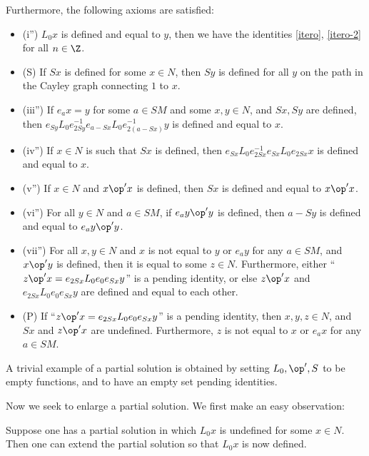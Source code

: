 Furthermore, the following axioms are satisfied:
\begin{itemize}
  \item (i'')  $L_0 x$ is defined and equal to $y$, then we have the identities \eqref{itero}, \eqref{itero-2} for all $n\in \Z$.
  \item (S) If $Sx$ is defined for some $x \in N$, then $Sy$ is defined for all $y$ on the path in the Cayley graph connecting $1$ to $x$.
  \item (iii'') If $e_a x = y$ for some $a \in SM$ and some $x,y \in N$, and $Sx, Sy$ are defined, then $e_{Sy} L_0 e_{2Sy}^{-1} e_{a-Sx} L_0 e_{2(a-Sx)}^{-1} y$ is defined and equal to $x$.
  \item (iv'') If $x \in N$ is such that $Sx$ is defined, then $e_{Sx} L_0 e_{2Sx}^{-1} e_{Sx} L_0 e_{2Sx} x$ is defined and equal to $x$.
  \item (v'')  If $x \in N$ and $x \op' x$ is defined, then $Sx$ is defined and equal to $x \op' x$.
  \item (vi'')  For all $y \in N$ and $a \in SM$, if $e_a y \op' y$ is defined, then $a - Sy$ is defined and equal to $e_a y \op' y$.
  \item (vii'')  For all $x,y \in N$ and $x$ is not equal to $y$ or $e_a y$ for any $a \in SM$, and $x \op' y$ is defined, then it is equal to some $z \in N$.  Furthermore, either ``$z \op' x = e_{2Sx} L_0 e_0 e_{Sx} y$'' is a pending identity, or else $z \op' x$ and $e_{2Sx} L_0 e_0 e_{Sx} y$ are defined and equal to each other.
  \item (P) If ``$z \op' x = e_{2Sx} L_0 e_0 e_{Sx} y$'' is a pending identity, then $x,y,z \in N$, and $Sx$ and $z \op' x$ are undefined.  Furthermore, $z$ is not equal to $x$ or $e_a x$ for any $a \in SM$.
\end{itemize}

A trivial example of a partial solution is obtained by setting $L_0, \op', S$ to be empty functions, and to have an empty set pending identities.

Now we seek to enlarge a partial solution. We first make an easy observation:

\begin{proposition}[Enlarging $L_0$]\label{enlarge-l0}  Suppose one has a partial solution in which $L_0 x$ is undefined for some $x \in N$.  Then one can extend the partial solution so that $L_0 x$ is now defined.
\end{proposition}

